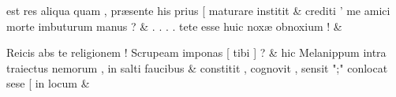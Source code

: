 \documentclass[12pt,onecolumn,twoside,a4paper]{memoir}
\begin{document}
\begin{pairs}
\begin{Leftside}
                              est
                              res
                              aliqua
                              quam
                              ,
                              præsente
                              his
                              prius
                              [
                              maturare
                              institit \&
                         \stanza {}
                     crediti
                              ’
                              me
                              amici
                              morte
                              imbuturum
                              manus
                              ? \&
                         \stanza {}
                     .
                              .
                              .
                              .
                              tete
                              esse
                              huic
                              noxæ
                              obnoxium
                              ! \&
                         \stanza {}
                     
                              Reicis
                              abs
                              te
                              religionem
                              !
                              Scrupeam
                              imponas
                              [
                              tibi
                              ]
                              ? \&
                         \stanza {}
                     hic
                              Melanippum
                              intra
                              traiectus
                              nemorum
                              ,
                              in
                              salti
                              faucibus \&
                         \stanza {}constitit
                              ,
                              cognovit
                              ,
                              sensit
                              ";"
                              conlocat
                              sese
                              [
                              in
                              locum & 
                     

\end{Leftside}
\end{pairs}
\end{document}
